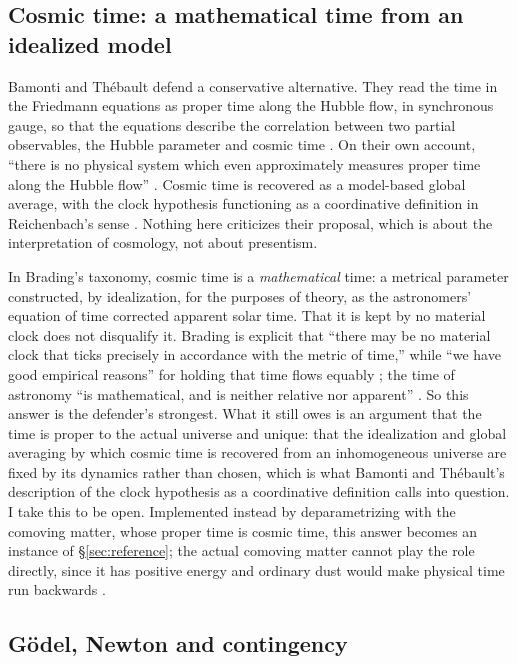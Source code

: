 \documentclass[11pt]{article}
\begin{document}
\subsection{Cosmic time: a mathematical time from an idealized model}\label{sec:cosmic}

Bamonti and Thébault defend a conservative alternative. They read the time in
the Friedmann equations as proper time along the Hubble flow, in synchronous
gauge, so that the equations describe the correlation between two partial
observables, the Hubble parameter and cosmic time
\citep[secs.~4--5]{BamontiThebault2025}. On their own account, ``there is no
physical system which even approximately measures proper time along the Hubble
flow'' \citep[p.~5]{BamontiThebault2025}. Cosmic time is recovered as a
model-based global average, with the clock hypothesis functioning as a
coordinative definition in Reichenbach's sense
\citep[pp.~19--20]{BamontiThebault2025}. Nothing here criticizes their proposal,
which is about the interpretation of cosmology, not about presentism.

In Brading's taxonomy, cosmic time is a \emph{mathematical} time: a metrical
parameter constructed, by idealization, for the purposes of theory, as the
astronomers' equation of time corrected apparent solar time. That it is kept by
no material clock does not disqualify it. Brading is explicit that ``there may be
no material clock that ticks precisely in accordance with the metric of time,''
while ``we have good empirical reasons'' for holding that time flows equably
\citep[p.~37]{Brading2017}; the time of astronomy ``is mathematical, and is
neither relative nor apparent'' \citep[p.~25]{Brading2017}.
So this answer is the defender's strongest. What it still owes is an argument that
the time is proper to the actual universe and unique: that the idealization and
global averaging by which cosmic time is recovered from an inhomogeneous universe
are fixed by its dynamics rather than chosen, which is what Bamonti and Thébault's
description of the clock hypothesis as a coordinative definition calls into
question. I take this to be open. Implemented instead by deparametrizing with the comoving matter, whose
proper time is cosmic time, this answer becomes an instance of
\S\ref{sec:reference}; the actual comoving matter cannot play the role directly,
since it has positive energy and ordinary dust would make physical time run
backwards \citep[p.~4]{GHTW2007a}.

\subsection{Gödel, Newton and contingency}\label{sec:godel}
\end{document}
